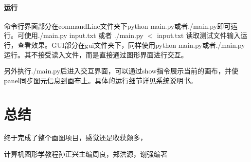 \documentclass[a4paper,UTF8]{article}
\theoremstyle{definition}
\begin{document}
\paragraph{运行}
命令行界面部分在commandLine文件夹下python main.py或者./main.py即可运行。可使用./main.py input.txt 或者 ./main.py $<$ input.txt 读取测试文件输入运行，查看效果。GUI部分在gui文件夹下，同样使用python main.py或者./main.py运行。其不接受读入文件，而是直接通过图形界面进行交互。
\par 另外执行./main.py后进入交互界面，可以通过show指令展示当前的画布，并使panel同步图元信息到画布上。具体的运行细节详见系统说明书。
\section{总结}
\paragraph{} 终于完成了整个画图项目，感觉还是收获颇多，
\begin{thebibliography}{2019}
 计算机图形学教程\quad 孙正兴主编\quad 周良，郑洪源，谢强编著
\end{thebibliography}
\end{document}
